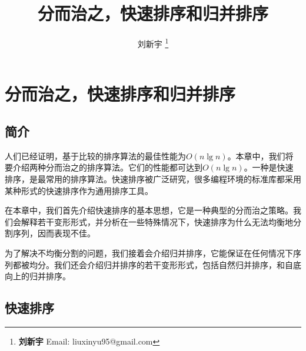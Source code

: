 \documentclass[UTF8]{article}
\begin{document}


\title{分而治之，快速排序和归并排序}

\author{刘新宇
\thanks{{\bfseries 刘新宇 } \newline
  Email: liuxinyu95@gmail.com \newline}
  }

\maketitle
\fi


\ifx\wholebook\relax
\chapter{分而治之，快速排序和归并排序}
\fi

\section{简介}
\label{introduction}

人们已经证明，基于比较的排序算法的最佳性能为$O(n \lg n)$\cite{TAOCP}。本章中，我们将要介绍两种分而治之的排序算法。它们的性能都可达到$O(n \lg n)$。一种是快速排序，是最常用的排序算法。快速排序被广泛研究，很多编程环境的标准库都采用某种形式的快速排序作为通用排序工具。

在本章中，我们首先介绍快速排序的基本思想，它是一种典型的分而治之策略。我们会解释若干变形形式，并分析在一些特殊情况下，快速排序为什么无法均衡地分割序列，因而表现不佳。

为了解决不均衡分割的问题，我们接着会介绍归并排序，它能保证在任何情况下序列都被均分。我们还会介绍归并排序的若干变形形式，包括自然归并排序，和自底向上的归并排序。

\section{快速排序}
\end{document}
